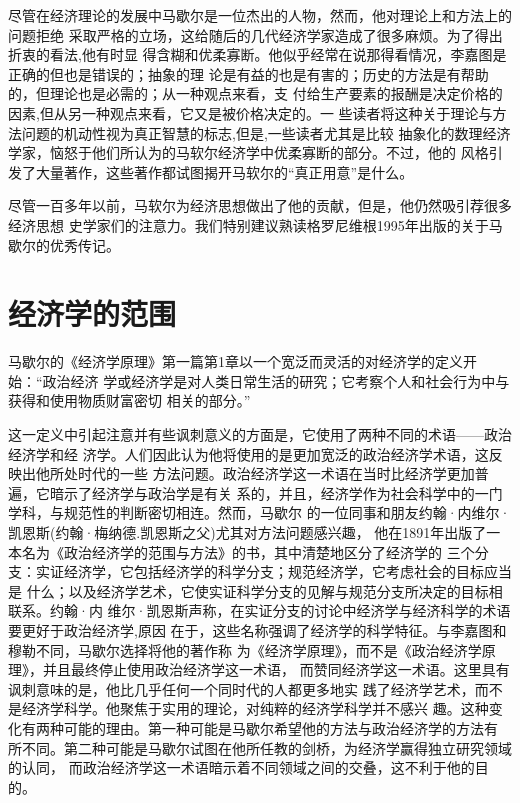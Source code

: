 尽管在经济理论的发展中马歇尔是一位杰出的人物，然而，他对理论上和方法上的问题拒绝
采取严格的立场，这给随后的几代经济学家造成了很多麻烦。为了得出折衷的看法,他有时显
得含糊和优柔寡断。他似乎经常在说那得看情况，李嘉图是正确的但也是错误的；抽象的理
论是有益的也是有害的；历史的方法是有帮助的，但理论也是必需的；从一种观点来看，支
付给生产要素的报酬是决定价格的因素,但从另一种观点来看，它又是被价格决定的。一
些读者将这种关于理论与方法问题的机动性视为真正智慧的标志,但是,一些读者尤其是比较
抽象化的数理经济学家，恼怒于他们所认为的马软尔经济学中优柔寡断的部分。不过，他的
风格引发了大量著作，这些著作都试图揭开马软尔的“真正用意”是什么。

尽管一百多年以前，马软尔为经济思想做出了他的贡献，但是，他仍然吸引荐很多经济思想
史学家们的注意力。我们特别建议熟读格罗尼维根1995年出版的关于马歇尔的优秀传记。

\section{经济学的范围}

马歇尔的《经济学原理》第一篇第1章以一个宽泛而灵活的对经济学的定义开始：“政治经济
学或经济学是对人类日常生活的研究；它考察个人和社会行为中与获得和使用物质财富密切
相关的部分。”

这一定义中引起注意并有些讽刺意义的方面是，它使用了两种不同的术语——政治经济学和经
济学。人们因此认为他将使用的是更加宽泛的政治经济学术语，这反映出他所处时代的一些
方法问题。政治经济学这一术语在当时比经济学更加普遍，它暗示了经济学与政治学是有关
系的，并且，经济学作为社会科学中的一门学科，与规范性的判断密切相连。然而，马歇尔
的一位同事和朋友约翰·内维尔·凯恩斯(约翰·梅纳德.凯恩斯之父)尤其对方法问题感兴趣，
他在1891年出版了一本名为《政治经济学的范围与方法》的书，其中清楚地区分了经济学的
三个分支：实证经济学，它包括经济学的科学分支；规范经济学，它考虑社会的目标应当是
什么；以及经济学艺术，它使实证科学分支的见解与规范分支所决定的目标相联系。约翰·内
维尔·凯恩斯声称，在实证分支的讨论中经济学与经济科学的术语要更好于政治经济学,原因
在于，这些名称强调了经济学的科学特征。与李嘉图和穆勒不同，马歇尔选择将他的著作称
为《经济学原理》，而不是《政治经济学原理》，并且最终停止使用政治经济学这一术语，
而赞同经济学这一术语。这里具有讽刺意味的是，他比几乎任何一个同时代的人都更多地实
践了经济学艺术，而不是经济学科学。他聚焦于实用的理论，对纯粹的经济学科学并不感兴
趣。这种变化有两种可能的理由。第一种可能是马歇尔希望他的方法与政治经济学的方法有
所不同。第二种可能是马歇尔试图在他所任教的剑桥，为经济学赢得独立研究领域的认同，
而政治经济学这一术语暗示着不同领域之间的交叠，这不利于他的目的。

